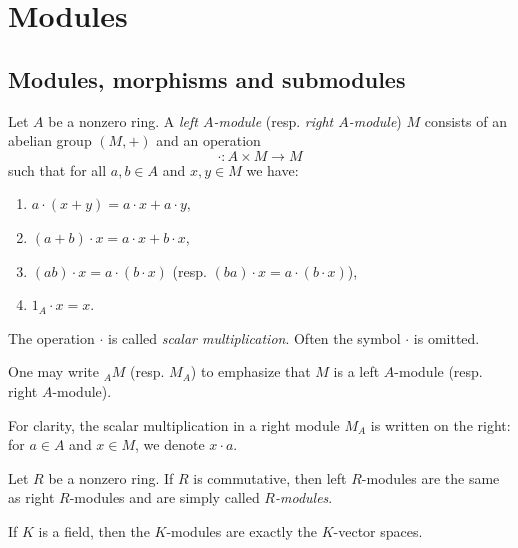 \documentclass[12pt]{report}
\begin{document}
\newpage
\section{Modules}
\subsection{Modules, morphisms and submodules}

\begin{definition} \label{def-lr-module}
    Let $A$ be a nonzero ring. A \emph{left $A$-module} (resp. \emph{right $A$-module}) $M$ consists of an abelian group $(M, +)$ and an operation
    \[
        \cdot \colon A \times M \to M
    \]
    such that for all $a, b \in A$ and $x, y \in M$ we have:
    \begin{enumerate}[label=(\roman*)]
        \item $a \cdot (x + y) = a \cdot x + a \cdot y$,
        \item $(a + b) \cdot x = a \cdot x + b \cdot x$,
        \item $(ab) \cdot x = a \cdot (b \cdot x)$ (resp. $(ba) \cdot x = a \cdot (b \cdot x)$),
        \item $1_{A} \cdot x = x$.
    \end{enumerate}
    The operation $\cdot$ is called \emph{scalar multiplication}. Often the symbol $\cdot$ is omitted. 
\end{definition}

\begin{notation}
    One may write $_{A} M$ (resp. $M_{A}$) to emphasize that $M$ is a left $A$-module (resp. right $A$-module).
\end{notation}

\begin{remark}
    For clarity, the scalar multiplication in a right module $M_{A}$ is written on the right: for $a \in A$ and $x \in M$, we denote $x \cdot a$.
\end{remark}

\begin{proposition}
    Let $R$ be a nonzero ring. If $R$ is commutative, then left $R$-modules are the same as right $R$-modules and are simply called \emph{$R$-modules}.
\end{proposition}

\begin{remark}
    If $K$ is a field, then the $K$-modules are exactly the $K$-vector spaces.
\end{remark}
\end{document}

